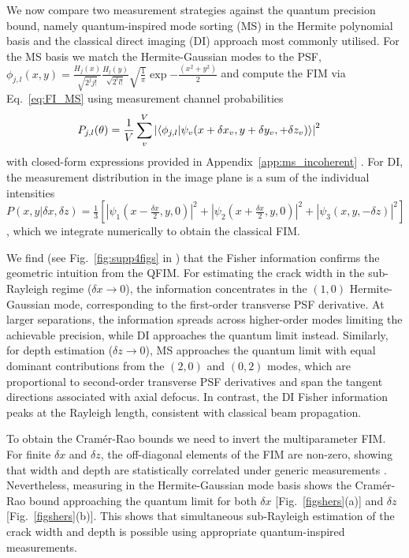 \documentclass[reprint,amsmath,amssymb,aps,prl,floatfix,groupedaddress,superscriptaddress]{revtex4-2}
\begin{document}
We now compare two measurement strategies against the quantum precision bound, namely quantum-inspired mode sorting (MS) in the Hermite polynomial basis and the classical direct imaging (DI) approach most commonly utilised. For the MS basis we match the Hermite-Gaussian modes to the PSF, $\phi_{j,l}(x,y) = \frac{H_j(x)}{\sqrt{2^j j!}} \frac{H_l(y)}{\sqrt{2^l l!}} \sqrt{\frac{1}{\pi}} \exp{-\frac{(x^2 + y^2)}{2}}$ and compute the FIM via Eq.~\eqref{eq:FI_MS} using measurement channel probabilities
\begin{align}
    P_{j,l}(\theta) &= \frac{1}{V} \sum_v^V  \abs{ \braket{\phi_{j,l}}{\psi_v(x + \delta x_v, y + \delta y_v, + \delta z_v)} }^2 \label{eq:prob_ms_general}
\end{align}
with closed-form expressions provided in Appendix~\ref{app:ms_incoherent} \cite{supposta}. For DI, the measurement distribution in the image plane is a sum of the individual intensities $P(x,y|\delta x,\delta z)=\frac13\left[{|{\psi_1(x\!-\!\frac{\delta x}{2},y,0)}|^2\!\! + \!|{\psi_2(x\!+\!\frac{\delta x}{2},y,0)}|^2\!\! + \!|{\psi_3(x,y,-\delta z)}|^2}\right]$, which we integrate numerically to obtain the classical FIM.

We find (see Fig.~\ref{fig:supp4figs} in \cite{supposta}) that the Fisher information confirms the geometric intuition from the QFIM. For estimating the crack width in the sub-Rayleigh regime ($\delta x \rightarrow 0$), the information concentrates  in the $(1,0)$ Hermite-Gaussian mode, corresponding to the first-order transverse PSF derivative. At larger separations, the information spreads across higher-order modes limiting the achievable precision, while  DI approaches the quantum limit instead. Similarly, for depth estimation  ($\delta z\rightarrow0$), MS approaches the quantum limit with equal dominant contributions from the $(2,0)$ and $(0,2)$ modes, which are proportional to second-order transverse PSF derivatives  and span the tangent directions associated with axial defocus. In contrast, the DI Fisher information peaks at the Rayleigh length, consistent with classical beam propagation.

To obtain the Cram\'er-Rao bounds we need to invert the multiparameter FIM. For finite $\delta x$ and $\delta z$, the off-diagonal elements of the FIM are non-zero, showing that width and depth are statistically correlated under generic measurements \cite{ragy2016compatibility}. Nevertheless, measuring in the Hermite-Gaussian mode basis shows the Cram\'er-Rao bound approaching the quantum limit for both $\delta x$ [Fig.~\ref{figshers}(a)] and $\delta z$ [Fig.~\ref{figshers}(b)]. This shows that simultaneous sub-Rayleigh estimation of the crack width and depth is possible using appropriate quantum-inspired measurements.
\end{document}
